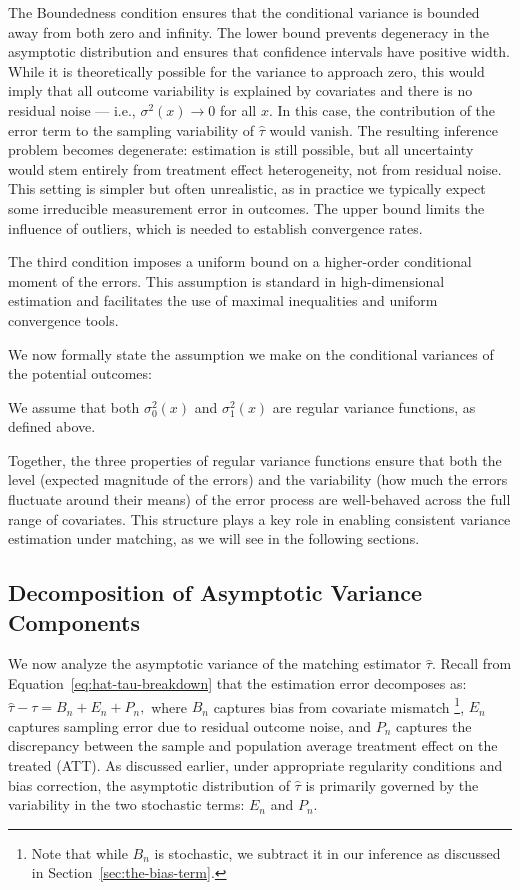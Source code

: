 \documentclass{mytemplate}
\begin{document}
The Boundedness condition ensures that the conditional variance is bounded away from both zero and infinity. The lower bound prevents degeneracy in the asymptotic distribution and ensures that confidence intervals have positive width. While it is theoretically possible for the variance to approach zero, this would imply that all outcome variability is explained by covariates and there is no residual noise — i.e., $\sigma^2(x) \to 0$ for all $x$. In this case, the contribution of the error term to the sampling variability of $\hat{\tau}$ would vanish. The resulting inference problem becomes degenerate: estimation is still possible, but all uncertainty would stem entirely from treatment effect heterogeneity, not from residual noise. This setting is simpler but often unrealistic, as in practice we typically expect some irreducible measurement error in outcomes. The upper bound limits the influence of outliers, which is needed to establish convergence rates.


The third condition imposes a uniform bound on a higher-order conditional moment of the errors. This assumption is standard in high-dimensional estimation and facilitates the use of maximal inequalities and uniform convergence tools.

We now formally state the assumption we make on the conditional variances of the potential outcomes:

\begin{assumption}
\label{assum:regular-variance}
We assume that both $\sigma_0^2(x)$ and $\sigma_1^2(x)$ are regular variance functions, as defined above.
\end{assumption}

\medskip

Together, the three properties of regular variance functions ensure that both the level (expected magnitude of the errors) and the variability (how much the errors fluctuate around their means) of the error process are well-behaved across the full range of covariates. This structure plays a key role in enabling consistent variance estimation under matching, as we will see in the following sections.

\subsection{Decomposition of Asymptotic Variance Components}
\label{sec:asymptotic-variance}

We now analyze the asymptotic variance of the matching estimator $\hat{\tau}$. Recall from Equation~\eqref{eq:hat-tau-breakdown} that the estimation error decomposes as: $\hat{\tau} - \tau = B_n + E_n + P_n,$ where $B_n$ captures bias from covariate mismatch \footnote{Note that while $B_n$ is stochastic, we subtract it in our inference as discussed in Section~\ref{sec:the-bias-term}.}, $E_n$ captures sampling error due to residual outcome noise, and $P_n$ captures the discrepancy between the sample and population average treatment effect on the treated (ATT). As discussed earlier, under appropriate regularity conditions and bias correction, the asymptotic distribution of $\hat{\tau}$ is primarily governed by the variability in the two stochastic terms: $E_n$ and $P_n$.
\end{document}
